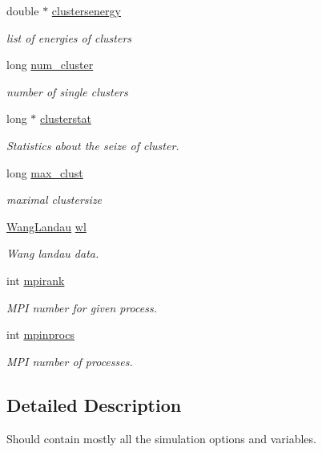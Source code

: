 \begin{DoxyCompactItemize}
double $\ast$ \hyperlink{class_sim_a3603ca84a589c3539406b38d7aff2065}{clustersenergy}
\begin{DoxyCompactList}\small\item\em list of energies of clusters \end{DoxyCompactList}\item 
long \hyperlink{class_sim_abd86b808fdd2c02341e4dc8f7e877c12}{num\+\_\+cluster}
\begin{DoxyCompactList}\small\item\em number of single clusters \end{DoxyCompactList}\item 
long $\ast$ \hyperlink{class_sim_a6362e502149a7cd3ed9fb0b0e9a3593e}{clusterstat}
\begin{DoxyCompactList}\small\item\em Statistics about the seize of cluster. \end{DoxyCompactList}\item 
long \hyperlink{class_sim_a61199ec6703bab63f3936d888b53ad26}{max\+\_\+clust}
\begin{DoxyCompactList}\small\item\em maximal clustersize \end{DoxyCompactList}\item 
\hyperlink{class_wang_landau}{Wang\+Landau} \hyperlink{class_sim_ade98939300538c5d79e144d8c583b258}{wl}
\begin{DoxyCompactList}\small\item\em Wang landau data. \end{DoxyCompactList}\item 
int \hyperlink{class_sim_ae308bc0b02dea185f040f25b16bbeed1}{mpirank}
\begin{DoxyCompactList}\small\item\em M\+P\+I number for given process. \end{DoxyCompactList}\item 
int \hyperlink{class_sim_a94c5eb8fae92f8803d17930fa29e40f2}{mpinprocs}
\begin{DoxyCompactList}\small\item\em M\+P\+I number of processes. \end{DoxyCompactList}\end{DoxyCompactItemize}


\subsection{Detailed Description}
Should contain mostly all the simulation options and variables. 


